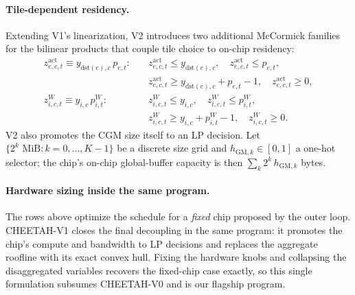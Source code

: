 \paragraph{Tile-dependent residency.}
Extending V1's linearization, V2 introduces two additional McCormick families
for the bilinear products that couple tile choice to on-chip residency:
\begin{equation}
\label{eq:mccormick_v2}
\begin{aligned}
z^{\mathrm{act}}_{e,c,t} \equiv y_{\mathrm{dst}(e),c}\, p_{e,t}: \quad
& z^{\mathrm{act}}_{e,c,t} \leq y_{\mathrm{dst}(e),c}, \quad
  z^{\mathrm{act}}_{e,c,t} \leq p_{e,t}, \\
& z^{\mathrm{act}}_{e,c,t} \geq y_{\mathrm{dst}(e),c} + p_{e,t} - 1, \quad
  z^{\mathrm{act}}_{e,c,t} \geq 0, \\[3pt]
z^{W}_{i,c,t} \equiv y_{i,c}\, p^{W}_{i,t}: \quad
& z^{W}_{i,c,t} \leq y_{i,c}, \quad
  z^{W}_{i,c,t} \leq p^{W}_{i,t}, \\
& z^{W}_{i,c,t} \geq y_{i,c} + p^{W}_{i,t} - 1, \quad
  z^{W}_{i,c,t} \geq 0.
\end{aligned}
\end{equation}
V2 also promotes the CGM size itself to an LP decision.  Let $\{2^k \text{ MiB}
: k = 0, \ldots, K-1\}$ be a discrete size grid and $h_{\mathrm{GM},k} \in [0,1]$
a one-hot selector; the chip's on-chip global-buffer capacity is then
$\sum_{k} 2^{k}\, h_{\mathrm{GM},k}$ bytes.

\paragraph{Hardware sizing inside the same program.}\label{sec:v3}
The rows above optimize the schedule for a \emph{fixed} chip proposed by the
outer loop. CHEETAH-V1 closes the final decoupling in the same program: it
promotes the chip's compute and bandwidth to LP decisions and replaces the
aggregate roofline with its exact convex hull. Fixing the hardware knobs and
collapsing the disaggregated variables recovers the fixed-chip case exactly, so
this single formulation subsumes CHEETAH-V0 and is our flagship program.

